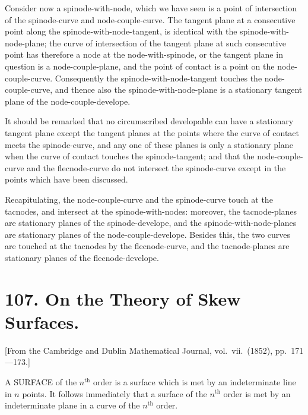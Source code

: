 \documentclass[11pt,a4paper]{article}
\theoremstyle{plain}
\begin{document}
Consider now a spinode-with-node, which we have seen is a point of intersection of the spinode-curve and node-couple-curve. The tangent plane at a consecutive point along the spinode-with-node-tangent, is identical with the spinode-with-node-plane; the curve of intersection of the tangent plane at such consecutive point has therefore a node at the node-with-spinode, or the tangent plane in question is a node-couple-plane, and the point of contact is a point on the node-couple-curve. Consequently the spinode-with-node-tangent touches the node-couple-curve, and thence also the spinode-with-node-plane is a stationary tangent plane of the node-couple-develope.

It should be remarked that no circumscribed developable can have a stationary tangent plane except the tangent planes at the points where the curve of contact meets the spinode-curve, and any one of these planes is only a stationary plane when the curve of contact touches the spinode-tangent; and that the node-couple-curve and the flecnode-curve do not intersect the spinode-curve except in the points which have been discussed.

Recapitulating, the node-couple-curve and the spinode-curve touch at the tacnodes, and intersect at the spinode-with-nodes: moreover, the tacnode-planes are stationary planes of the spinode-develope, and the spinode-with-node-planes are stationary planes of the node-couple-develope. Besides this, the two curves are touched at the tacnodes by the flecnode-curve, and the tacnode-planes are stationary planes of the flecnode-develope.
\clearpage


\section*{107. On the Theory of Skew Surfaces.}

[From the Cambridge and Dublin Mathematical Journal, vol.\ vii.\ (1852), pp.\ 171---173.]

A SURFACE of the $n^{\text{th}}$ order is a surface which is met by an indeterminate line in $n$ points. It follows immediately that a surface of the $n^{\text{th}}$ order is met by an indeterminate plane in a curve of the $n^{\text{th}}$ order.
\end{document}
